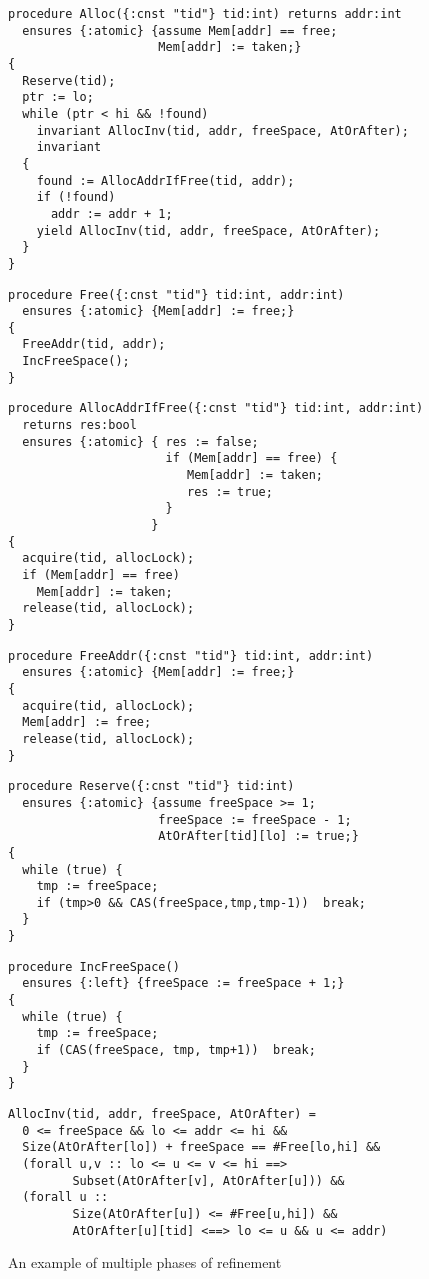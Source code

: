 \begin{figure}
\begin{small}
\begin{verbatim}
procedure Alloc({:cnst "tid"} tid:int) returns addr:int
  ensures {:atomic} {assume Mem[addr] == free;  
                     Mem[addr] := taken;}
{
  Reserve(tid);         
  ptr := lo;
  while (ptr < hi && !found)
    invariant AllocInv(tid, addr, freeSpace, AtOrAfter);
    invariant 
  { 
    found := AllocAddrIfFree(tid, addr);
    if (!found) 
      addr := addr + 1;
    yield AllocInv(tid, addr, freeSpace, AtOrAfter);
  }
}
\end{verbatim}
\begin{verbatim}
procedure Free({:cnst "tid"} tid:int, addr:int)
  ensures {:atomic} {Mem[addr] := free;}
{
  FreeAddr(tid, addr);  
  IncFreeSpace(); 
}
\end{verbatim}
\begin{verbatim}
procedure AllocAddrIfFree({:cnst "tid"} tid:int, addr:int) 
  returns res:bool
  ensures {:atomic} { res := false;
                      if (Mem[addr] == free) {
                         Mem[addr] := taken; 
                         res := true;
                      }  
                    }
{
  acquire(tid, allocLock);
  if (Mem[addr] == free)
    Mem[addr] := taken;   
  release(tid, allocLock);
}
\end{verbatim}
\begin{verbatim}
procedure FreeAddr({:cnst "tid"} tid:int, addr:int)
  ensures {:atomic} {Mem[addr] := free;}
{
  acquire(tid, allocLock);
  Mem[addr] := free;   
  release(tid, allocLock);
}
\end{verbatim}
\begin{verbatim}
procedure Reserve({:cnst "tid"} tid:int) 
  ensures {:atomic} {assume freeSpace >= 1; 
                     freeSpace := freeSpace - 1;
                     AtOrAfter[tid][lo] := true;}
{
  while (true) {
    tmp := freeSpace;
    if (tmp>0 && CAS(freeSpace,tmp,tmp-1))  break;
  }
}
\end{verbatim}
\begin{verbatim}
procedure IncFreeSpace() 
  ensures {:left} {freeSpace := freeSpace + 1;}
{
  while (true) {
    tmp := freeSpace;
    if (CAS(freeSpace, tmp, tmp+1))  break;
  }
}
\end{verbatim}
\begin{verbatim}
AllocInv(tid, addr, freeSpace, AtOrAfter) = 
  0 <= freeSpace && lo <= addr <= hi &&
  Size(AtOrAfter[lo]) + freeSpace == #Free[lo,hi] && 
  (forall u,v :: lo <= u <= v <= hi ==> 
         Subset(AtOrAfter[v], AtOrAfter[u])) &&
  (forall u :: 
         Size(AtOrAfter[u]) <= #Free[u,hi]) &&
         AtOrAfter[u][tid] <==> lo <= u && u <= addr)
\end{verbatim}
\end{small}
\caption{An example of multiple phases of refinement}
\label{fig:refinement}
\end{figure}

